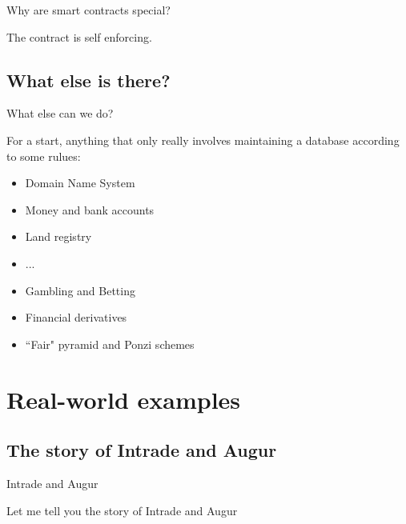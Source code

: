 \documentclass{beamer}
\begin{document}

\begin{frame}{Why are smart contracts special?}

The contract is \alert<1>{self enforcing}.\\

 
\end{frame}

\subsection{What else is there?}
\begin{frame}{What else can we do?}

For a start, anything that only really involves maintaining a database according to some rulues:
\begin{itemize}
 \item<2-> Domain Name System
 \item<3-> Money and bank accounts 
 \item<4-> Land registry
 \item<4-> ...
\end{itemize}

\begin{itemize}
 \item<5-> Gambling and Betting
 \item<6-> Financial derivatives
 \item<7-> ``Fair" pyramid and Ponzi schemes
\end{itemize}

\end{frame}

\wholeslide{}

\section[examples]{Real-world examples}

\subsection[prediciton market]{The story of Intrade and Augur}
\begin{frame}{Intrade and Augur}

 Let me tell you the story of Intrade and Augur
 
\end{frame}
\end{document}
